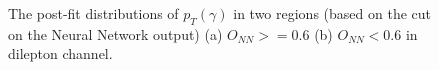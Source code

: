 \begin{figure}[ht]
  \centering
  \quad\quad
  \caption{The post-fit distributions of $p_T(\gamma)$ in two regions (based on the cut on the Neural Network output) (a) $O_{NN}>=0.6$ (b) $O_{NN}<0.6$ 
  in dilepton channel.}
  \label{fig:pt_postfit_dilep_tty_total_realdata}
\end{figure}




